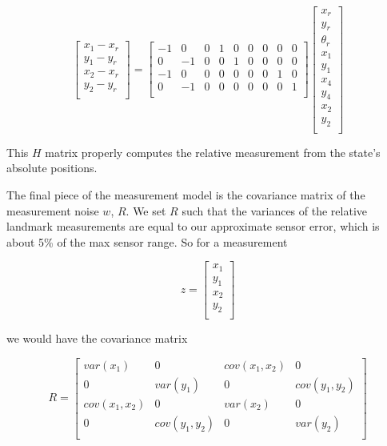 \documentclass[prodmode,acmtecs]{acmsmall} %
\begin{document}
$$
\begin{bmatrix}
    x_1 - x_r \\
    y_1 - y_r \\
    x_2 - x_r \\
    y_2 - y_r \\
\end{bmatrix}
=
\begin{bmatrix}
    -1 & 0 & 0 & 1 & 0 & 0 & 0 & 0 & 0 \\
    0 & -1 & 0 & 0 & 1 & 0 & 0 & 0 & 0 \\
    -1 & 0 & 0 & 0 & 0 & 0 & 0 & 1 & 0 \\
    0 & -1 & 0 & 0 & 0 & 0 & 0 & 0 & 1 \\
\end{bmatrix}
\begin{bmatrix}
    x_r \\
    y_r \\
    \theta_r \\
    x_1 \\
    y_1 \\
    x_4 \\
    y_4 \\
    x_2 \\
    y_2 \\
\end{bmatrix}
$$

This $H$ matrix properly computes the relative measurement from the state's absolute positions.

The final piece of the measurement model is the covariance matrix of the measurement noise $w$, $R$. We set $R$ such that the variances of the relative landmark measurements are equal to our approximate sensor error, which is about 5\% of the max sensor range. So for a measurement

$$
z
=
\begin{bmatrix}
    x_1 \\
    y_1 \\
    x_2 \\
    y_2 \\
\end{bmatrix}
$$

we would have the covariance matrix

$$
R
=
\begin{bmatrix}
    var(x_1)     & 0            & cov(x_1,x_2) & 0            \\
    0            & var(y_1)     & 0            & cov(y_1,y_2) \\
    cov(x_1,x_2) & 0            & var(x_2)     & 0            \\
    0            & cov(y_1,y_2) & 0            & var(y_2)     \\
\end{bmatrix}
$$
\end{document}
